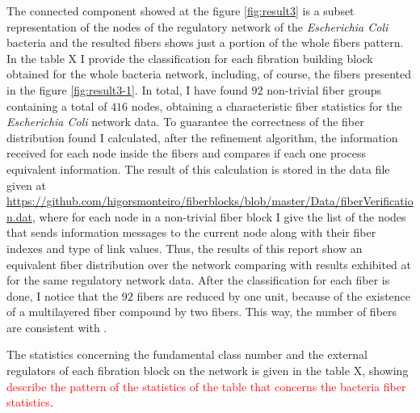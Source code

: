 \documentclass[12pt]{diazessay} %
\begin{document}
The connected component showed at the figure \ref{fig:result3} is a subset representation of the nodes of the regulatory network of the \textit{Escherichia Coli} bacteria and the resulted fibers shows just a portion of the whole fibers pattern. In the table X I provide the classification for each fibration building block obtained for the whole bacteria network, including, of course, the fibers presented in the figure \ref{fig:result3-1}. In total, I have found $92$ non-trivial fiber groups containing a total of $416$ nodes, obtaining a characteristic fiber statistics for the \textit{Escherichia Coli} network data. To guarantee the correctness of the fiber distribution found I calculated, after the refinement algorithm, the information received for each node inside the fibers and compares if each one process equivalent information. The result of this calculation is stored in the data file given at \url{https://github.com/higorsmonteiro/fiberblocks/blob/master/Data/fiberVerification.dat}, where for each node in a non-trivial fiber block I give the list of the nodes that sends information messages to the current node along with their fiber indexes and type of link values. Thus, the results of this report show an equivalent fiber distribution over the network comparing with results exhibited at \cite{fibration2019} for the same regulatory network data. After the classification for each fiber is done, I notice that the $92$ fibers are reduced by one unit, because of the existence of a multilayered fiber compound by two fibers. This way, the number of fibers are consistent with \cite{fibration2019}.

The statistics concerning the fundamental class number and the external regulators of each fibration block on the network is given in the table X, showing \textcolor{red}{describe the pattern of the statistics of the table that concerns the bacteria fiber statistics}.







\end{document}
